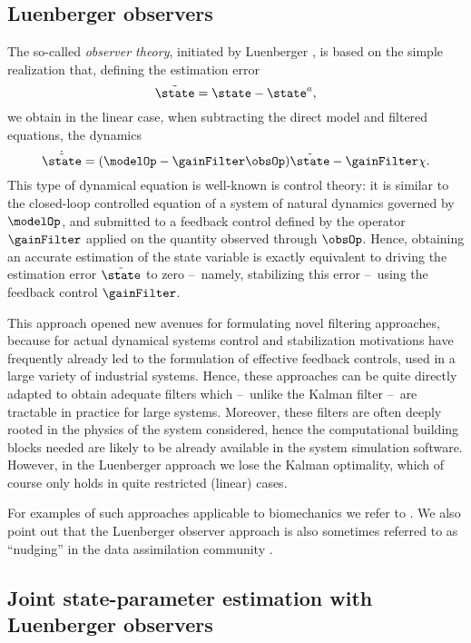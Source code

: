 \documentclass{tufte-book}
\begin{document}
\subsection{Luenberger observers}

The so-called \emph{observer theory}, initiated by Luenberger \cite{Luenberger63}, is based on the simple realization that, defining the estimation error
\[
	\tilde{\state} = \state - \state^a,
\]
we obtain in the linear case, when subtracting the direct model and filtered equations, the dynamics
\begin{equation}
	\dot{\tilde{\state}} = (\modelOp-\gainFilter\obsOp) \tilde{\state} - \gainFilter\chi.
\end{equation}
This type of dynamical equation is well-known is control theory: it is similar to the closed-loop controlled equation of a system of natural dynamics governed by $\modelOp$, and submitted to a feedback control defined by the operator $\gainFilter$ applied on the quantity observed through $\obsOp$. Hence, obtaining an accurate estimation of the state variable is exactly equivalent to driving the estimation error $\tilde{\state}$ to zero --~namely, stabilizing this error --~using the feedback control $\gainFilter$.

This approach opened new avenues for formulating novel filtering approaches, because for actual dynamical systems control and stabilization motivations have frequently already led to the formulation of effective feedback controls, used in a large variety of industrial systems. Hence, these approaches can be quite directly adapted to obtain adequate filters which --~unlike the Kalman filter --~are tractable in practice for large systems. Moreover, these filters are often deeply rooted in the physics of the system considered, hence the computational building blocks needed are likely to be already available in the system simulation software. However, in the Luenberger approach we lose the Kalman optimality, which of course only holds in quite restricted (linear) cases.

For examples of such approaches applicable to biomechanics we refer to \cite{PM-DC-PLT-09}. We also point out that the Luenberger observer approach is also sometimes referred to as ``nudging'' in the data assimilation community \cite{Auroux:2008p2884}.


\subsection{Joint state-parameter estimation with Luenberger observers}
\end{document}
